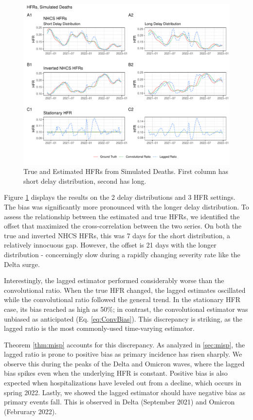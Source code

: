 \documentclass{article}
\begin{document}
\begin{figure}
    \centering
    \includegraphics[width=\linewidth]{Figs/Simulated/simulated_results.pdf}
    \caption{True and Estimated HFRs from Simulated Deaths. First column has short delay distribution, second has long.}
    \label{fig:sims}
\end{figure}

Figure \ref{fig:sims} displays the results on the 2 delay distributions and 3 HFR settings. The bias was significantly more pronounced with the longer delay distribution. To assess the relationship between the estimated and true HFRs, we identified the offset that maximized the cross-correlation between the two series. On both the true and inverted NHCS HFRs, this was 7 days for the short distribution, a relatively innocuous gap. However, the offset is 21 days with the longer distribution - concerningly slow during a rapidly changing severity rate like the Delta surge.

Interestingly, the lagged estimator performed considerably worse than the convolutional ratio. When the true HFR changed, the lagged estimates oscillated while the convolutional ratio followed the general trend. In the stationary HFR case, its bias reached as high as 50\%; in contrast, the convolutional estimator was unbiased as anticipated (Eq. \eqref{eq:ConvBias}). This discrepancy is striking, as the lagged ratio is the most commonly-used time-varying estimator. 

Theorem \ref{thm:misp} accounts for this discrepancy. As analyzed in \ref{sec:misp}, the lagged ratio is prone to positive bias as primary incidence has risen sharply. We observe this during the peaks of the Delta and Omicron waves, where the lagged bias spikes even when the underlying HFR is constant. Positive bias is also expected when hospitalizations have leveled out from a decline, which occurs in spring 2022. Lastly, we showed the lagged estimator should have negative bias as primary events fall. This is observed in Delta (September 2021) and Omicron (Februrary 2022). 
\end{document}
